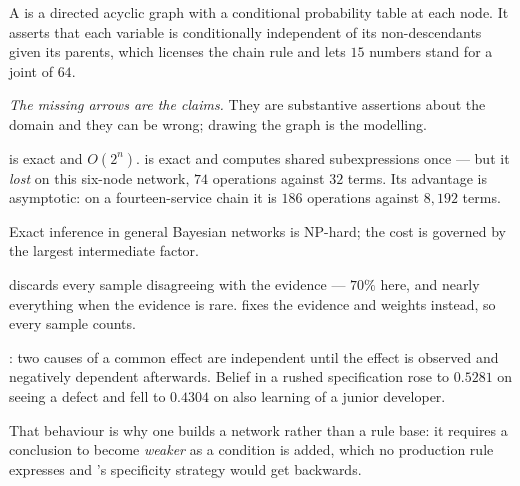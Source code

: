 \begin{chaptersummary}
\begin{tight}
  \item A  is a directed acyclic graph with a conditional
        probability table at each node. It asserts that each variable is
        conditionally independent of its non-descendants given its parents, which
        licenses the chain rule and lets $15$ numbers stand for a joint of $64$.
  \item \emph{The missing arrows are the claims.} They are substantive assertions
        about the domain and they can be wrong; drawing the graph is the modelling.
  \item {} is exact and $O(2^{n})$.  is
        exact and computes shared subexpressions once --- but it \emph{lost} on this
        six-node network, $74$ operations against $32$ terms. Its advantage is
        asymptotic: on a fourteen-service chain it is $186$ operations against
        $8{,}192$ terms.
  \item Exact inference in general Bayesian networks is NP-hard; the cost is
        governed by the largest intermediate factor.
  \item {} discards every sample disagreeing with the
        evidence --- $70\%$ here, and nearly everything when the evidence is rare.
         fixes the evidence and weights instead, so every
        sample counts.
  \item {}: two causes of a common effect are independent until
        the effect is observed and negatively dependent afterwards. Belief in a
        rushed specification rose to $0.5281$ on seeing a defect and fell to
        $0.4304$ on also learning of a junior developer.
  \item That behaviour is why one builds a network rather than a rule base: it
        requires a conclusion to become \emph{weaker} as a condition is added,
        which no production rule expresses and 's specificity
        strategy would get backwards.
\end{tight}
\end{chaptersummary}

